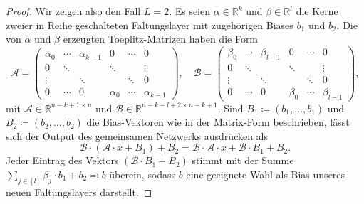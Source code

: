 \documentclass[paper=a4, 	%
		fontsize=11pt, 		%
		abstracton, 	%
		headsepline, 	%
		notitlepage	%
		]{scrartcl}
\theoremstyle{definition}
\newcommand{\R}{\mathbb{R}}
\newcommand{\fNat}[1]{[ #1 ]}
\begin{document}
\begin{proof}
    Wir zeigen also den Fall $L=2$. Es seien $\alpha\in \R^k$ und $\beta\in\R^l$ die Kerne zweier in Reihe geschalteten Faltungslayer mit zugehörigen Biases $b_1$ und $b_2$.
    Die von $\alpha$ und $\beta$ erzeugten Toeplitz-Matrizen haben die Form
    \setlength\arraycolsep{2pt}
    \def\arraystretch{0.5}
    \[
        \mathcal{A} = \left(
            \begin{matrix}
                \alpha_0 & \cdots & \alpha_{k-1} & 0 & \cdots & 0 \\
                0 & \ddots & & \ddots  & & \vdots \\
                \vdots  & & \ddots & & \ddots & 0 \\[4pt]
                    0 & \cdots & 0 & \alpha_0 & \cdots & \alpha_{k-1}
            \end{matrix}
        \right),\quad
        \mathcal{B} = \left(
            \begin{matrix}
                \beta_0 & \cdots & \beta_{l-1} & 0 & \cdots & 0 \\
                0 & \ddots & & \ddots  & & \vdots \\
                \vdots  & & \ddots & & \ddots & 0 \\[4pt]
                    0 & \cdots & 0 & \beta_0 & \cdots & \beta_{l-1}
            \end{matrix}
        \right),
    \]
    mit $\mathcal{A}\in\R^{n - k + 1\times n}$ und $\mathcal{B}\in \R^{n-k-l+2 \times n-k+1}$.
    Sind $B_1\coloneqq (b_1,\dots,b_1)$ und $B_2\coloneqq (b_2,\dots,b_2)$ die Bias-Vektoren wie in der Matrix-Form beschrieben, lässt sich der Output des gemeinsamen Netzwerks ausdrücken als
    \[
        \mathcal{B}\cdot \left( \mathcal{A}\cdot x + B_1 \right) + B_2
        = \mathcal{B}\cdot \mathcal{A}\cdot x + \mathcal{B}\cdot B_1 + B_2.
    \]
    Jeder Eintrag des Vektors $(\mathcal{B}\cdot B_1 + B_2)$ stimmt mit der Summe $\sum_{j\in\fNat{l}} \beta_j\cdot b_1 + b_2 \eqqcolon b$ überein, sodass $b$ eine geeignete Wahl als Bias unseres neuen Faltungslayers darstellt.
    

\end{proof}
\end{document}
